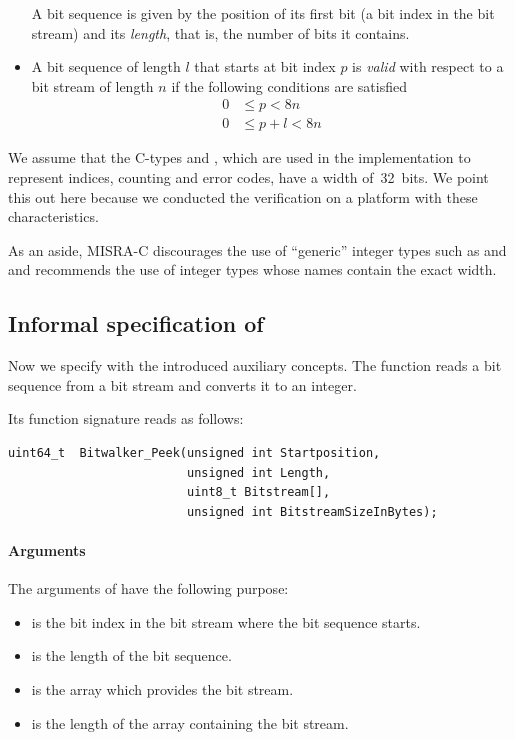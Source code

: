 \begin{itemize}
A bit sequence is given by the position of its first bit (a bit index in the bit stream)
and its \emph{length}, that is, the number of bits it contains.

\item A bit sequence of length $l$ that starts at bit index $p$ is \emph{valid}
     with respect to a bit stream of length $n$ if the following conditions are
     satisfied
     \begin{align*}
         0 &\leq p < 8n \\
         0 &\leq p + l < 8n
     \end{align*}

\end{itemize}

We assume that the C-types  and , which
are used in the implementation to represent indices, counting and error codes,
have a width of~32~bits.
We point this out here because we conducted the verification on a platform with
these characteristics.

As an aside, MISRA-C discourages the use of ``generic'' integer types
such as  and  and recommends the use of integer types whose names
contain the exact width.

\subsection{Informal specification of \peek}
\label{sec:informal-peek}

Now we specify \peek with the introduced auxiliary concepts.
The function \peek reads a bit sequence from a bit stream
and converts it to an integer.

Its function signature reads as follows:

\begin{lstlisting}[style=acsl-block]
uint64_t  Bitwalker_Peek(unsigned int Startposition, 
                         unsigned int Length,
                         uint8_t Bitstream[],
                         unsigned int BitstreamSizeInBytes);
\end{lstlisting}

\paragraph{Arguments}
The arguments of \peek have the following purpose:
\begin{itemize}
    \item {} is the bit index in the bit stream 
    where the bit sequence starts.
    \item {} is the length of the bit sequence.
    \item {} is the array which provides the bit stream.
    \item {} is the length of the array 
    containing the bit stream. 
\end{itemize}

